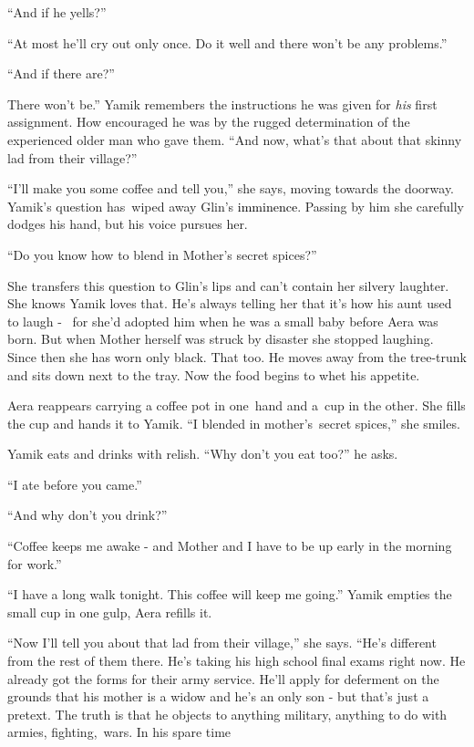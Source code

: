 \documentclass[letterpaper]{article}
\begin{document}
{}``And if he yells?'' 

{}``At most he'll cry out only once. Do it well and there won't be any problems.'' 

{}``And if there are?'' 

{\textquotedbl}There won't be.'' Yamik remembers the instructions he was given for \textit{his} first assignment. How
encouraged he was by the rugged determination of the experienced older man who gave them. ``And now, what's that about
that skinny lad from their village?'' 

{}``I'll make you some coffee and tell you,'' she says, moving towards the doorway. Yamik's question has~wiped away
Glin's \textcolor{black}{imminence}. Passing by him she carefully dodges his hand, but his voice pursues her. 

{}``Do you know how to blend in Mother's secret spices?'' 

She transfers this question to Glin's lips and can't contain her silvery laughter. She knows Yamik loves that. He's
always telling her that it's how his aunt used to laugh - \ for she'd adopted him when he was a small baby before Aera
was born. But when Mother herself was struck by disaster she stopped laughing. Since then she has worn only black. That
too. He moves away from the tree-trunk and sits down next to the tray. Now the food begins to whet his appetite. 

Aera reappears carrying a coffee pot in one~hand and a~cup in the other. She fills the cup and hands it to Yamik. ``I
blended in mother's~secret spices,'' she smiles.~ 

Yamik eats and drinks with relish. ``Why don't you eat too?'' he asks. 

{}``I ate before you came.'' 

{}``And why don't you drink?'' 

{}``Coffee keeps me awake - and Mother and I have to be up early in the morning for work.'' 

{}``I have a long walk tonight. This coffee will keep me going.'' Yamik empties the small cup in one gulp, Aera refills
it. 

{}``Now I'll tell you about that lad from their village,'' she says. ``He's different from the rest of them there. He's
taking his high school final exams right now. He already got the forms for their army service. He'll apply for
deferment on the grounds that his mother is a widow and he's an only son - but that's just a pretext. The truth is that
he objects to anything military, anything to do with armies, fighting,~wars. In his spare time 
\end{document}
